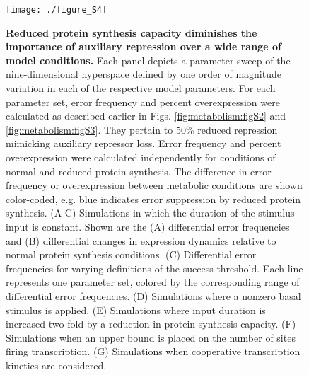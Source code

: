\begin{figure}[h!]
\label{fig:metabolism:figS4}
\centering
\texttt{[image: ./figure\_S4]}
\caption[Reduced protein synthesis capacity diminishes the importance of auxiliary repression over a wide range of model conditions.]{\textbf{Reduced protein synthesis capacity diminishes the importance of auxiliary repression over a wide range of model conditions.} Each panel depicts a parameter sweep of the nine-dimensional hyperspace defined by one order of magnitude variation in each of the respective model parameters. For each parameter set, error frequency and percent overexpression were calculated as described earlier in Figs. \ref{fig:metabolism:figS2} and \ref{fig:metabolism:figS3}. They pertain to 50\% reduced repression mimicking auxiliary repressor loss. Error frequency and percent overexpression were calculated independently for conditions of normal and reduced protein synthesis. The difference in error frequency or overexpression between metabolic conditions are shown color-coded, e.g. blue indicates error suppression by reduced protein synthesis. (A-C) Simulations in which the duration of the stimulus input is constant. Shown are the (A) differential error frequencies and (B) differential changes in expression dynamics relative to normal protein synthesis conditions. (C) Differential error frequencies for varying definitions of the success threshold. Each line represents one parameter set, colored by the corresponding range of differential error frequencies. (D) Simulations where a nonzero basal stimulus is applied. (E) Simulations where input duration is increased two-fold by a reduction in protein synthesis capacity. (F) Simulations when an upper bound is placed on the number of sites firing transcription. (G) Simulations when cooperative transcription kinetics are considered.}
\end{figure}
